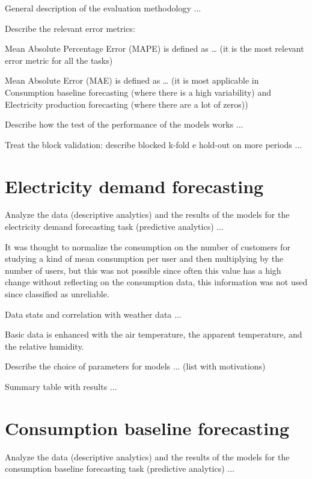 General description of the evaluation methodology ...

Describe the relevant error metrics:

Mean Absolute Percentage Error (MAPE) is defined as … (it is the most relevant error metric for all the tasks)

Mean Absolute Error (MAE) is defined as … (it is most applicable in Consumption baseline forecasting (where there is a high variability) and Electricity production forecasting (where there are a lot of zeros))

Describe how the test of the performance of the models works ...

Treat the block validation: describe blocked k-fold e hold-out on more periods ...


\section{Electricity demand forecasting}
\label{sec:demandval}
\vspace{0.2 cm}

Analyze the data (descriptive analytics) and the results of the models for the electricity demand forecasting task (predictive analytics) ...

It was thought to normalize the consumption on the number of customers for studying a kind of mean consumption per user and then multiplying by the number of users, but this was not possible since often this value has a high change without reflecting on the consumption data, this information was not used since classified as unreliable.

Data stats and correlation with weather data ...

Basic data is enhanced with the air temperature, the apparent temperature, and the relative humidity.

Describe the choice of parameters for models ... (list with motivations)

Summary table with results ...


\section{Consumption baseline forecasting}
\label{sec:baselineval}
\vspace{0.2 cm}

Analyze the data (descriptive analytics) and the results of the models for the consumption baseline forecasting task (predictive analytics) ...

